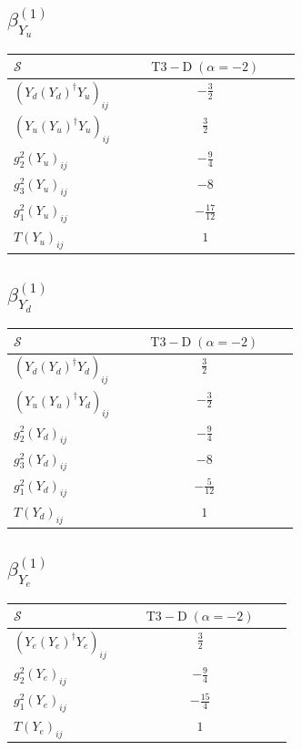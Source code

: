 \documentclass[9pt]{article}
\begin{document}
\subsection*{$ \beta_{Y_u}^{(1)} $}
\begin{longtable}{@{}p{0.38\linewidth}c@{}}
\toprule
$\mathcal{S}$ & $ \mathrm{T3-D}\;(\alpha=-2) $ \\
\midrule
$ (Y_d (Y_d)^{\dagger} Y_u)_{ij} $ & $ - \frac{3}{2} $ \\
$ (Y_u (Y_u)^{\dagger} Y_u)_{ij} $ & $ \frac{3}{2} $ \\
$ g_2^2 (Y_u)_{ij} $ & $ - \frac{9}{4} $ \\
$ g_3^2 (Y_u)_{ij} $ & $ -8 $ \\
$ g_1^2 (Y_u)_{ij} $ & $ - \frac{17}{12} $ \\
$ T (Y_u)_{ij} $ & $ 1 $ \\
\bottomrule
\end{longtable}
\subsection*{$ \beta_{Y_d}^{(1)} $}
\begin{longtable}{@{}p{0.38\linewidth}c@{}}
\toprule
$\mathcal{S}$ & $ \mathrm{T3-D}\;(\alpha=-2) $ \\
\midrule
$ (Y_d (Y_d)^{\dagger} Y_d)_{ij} $ & $ \frac{3}{2} $ \\
$ (Y_u (Y_u)^{\dagger} Y_d)_{ij} $ & $ - \frac{3}{2} $ \\
$ g_2^2 (Y_d)_{ij} $ & $ - \frac{9}{4} $ \\
$ g_3^2 (Y_d)_{ij} $ & $ -8 $ \\
$ g_1^2 (Y_d)_{ij} $ & $ - \frac{5}{12} $ \\
$ T (Y_d)_{ij} $ & $ 1 $ \\
\bottomrule
\end{longtable}
\subsection*{$ \beta_{Y_e}^{(1)} $}
\begin{longtable}{@{}p{0.38\linewidth}c@{}}
\toprule
$\mathcal{S}$ & $ \mathrm{T3-D}\;(\alpha=-2) $ \\
\midrule
$ (Y_e (Y_e)^{\dagger} Y_e)_{ij} $ & $ \frac{3}{2} $ \\
$ g_2^2 (Y_e)_{ij} $ & $ - \frac{9}{4} $ \\
$ g_1^2 (Y_e)_{ij} $ & $ - \frac{15}{4} $ \\
$ T (Y_e)_{ij} $ & $ 1 $ \\
\bottomrule
\end{longtable}
\end{document}
